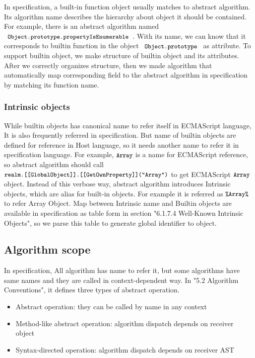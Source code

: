  In specification, a built-in function object usually matches to abstract algorithm. Its algorithm name
 describes the hierarchy about object it should be contained. For example, there is an abstract algorithm named \( \code{ Object.prototype.propertyIsEnumerable } \). With its name,
 we can know that it corresponds to builtin function in the object \( \code{ Object.prototype } \) as attribute. 
 To support builtin object, we make structure of builtin object and its attributes.
 After we correctly organizes structure, then we made algorithm that automatically map corresponding field to the abstract algorithm in specification by matching its function name.
 
 \subsubsection{Intrinsic objects}

 While builtin objects has canonical name to refer itself in ECMAScript language, It is also frequently referred in specification. But name of builtin objects
 are defined for reference in Host language, so it needs another name to refer it in specification language. For example, \( \texttt{\small Array} \) is a name for
 ECMAScript reference, so abstract algorithm should call \\
 \( \texttt{\small realm.[[GlobalObject]].[[GetOwnProperty]]("Array")} \) to get ECMAScript \( \texttt{\small Array} \) object. Instead of this verbose way, abstract algorithm introduces Intrinsic objects, which
are alias for built-in objects. For example it is referred as \( \texttt{\small\%Array\%} \) to refer Array Object.
 Map between Intrinsic name and Builtin objects are available in specification as table form in section "6.1.7.4 Well-Known Intrinsic Objects", so we parse this table to generate global identifier to object.

\subsection{Algorithm scope}

 In specification, All algorithm has name to refer it, but some algorithms have same names and they are called in context-dependent way.
In "5.2 Algorithm Conventions", it defines three types of abstract operation.
 \begin{itemize}
  \item Abstract operation: they can be called by name in any context
  \item Method-like abstract operation: algorithm dispatch depends on receiver object
  \item Syntax-directed operation: algorithm dispatch depends on receiver AST
  \end{itemize}

